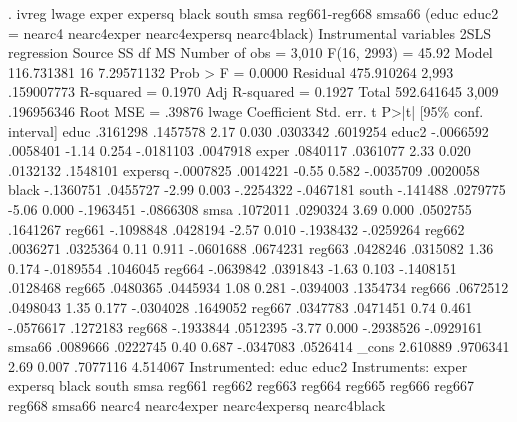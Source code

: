 . ivreg lwage exper expersq black south smsa reg661-reg668 smsa66 (educ educ2 = nearc4 nearc4exper nearc4expersq nearc4black)
{\smallskip}
Instrumental variables 2SLS regression
{\smallskip}
      Source {\VBAR}       SS           df       MS      Number of obs   =     3,010
   F(16, 2993)     =     45.92
       Model {\VBAR}  116.731381        16  7.29571132   Prob > F        =    0.0000
    Residual {\VBAR}  475.910264     2,993  .159007773   R-squared       =    0.1970
   Adj R-squared   =    0.1927
       Total {\VBAR}  592.641645     3,009  .196956346   Root MSE        =    .39876
{\smallskip}
       lwage {\VBAR} Coefficient  Std. err.      t    P>|t|     [95\% conf. interval]
        educ {\VBAR}   .3161298   .1457578     2.17   0.030     .0303342    .6019254
       educ2 {\VBAR}  -.0066592   .0058401    -1.14   0.254    -.0181103    .0047918
       exper {\VBAR}   .0840117   .0361077     2.33   0.020     .0132132    .1548101
     expersq {\VBAR}  -.0007825   .0014221    -0.55   0.582    -.0035709    .0020058
       black {\VBAR}  -.1360751   .0455727    -2.99   0.003    -.2254322   -.0467181
       south {\VBAR}   -.141488   .0279775    -5.06   0.000    -.1963451   -.0866308
        smsa {\VBAR}   .1072011   .0290324     3.69   0.000     .0502755    .1641267
      reg661 {\VBAR}  -.1098848   .0428194    -2.57   0.010    -.1938432   -.0259264
      reg662 {\VBAR}   .0036271   .0325364     0.11   0.911    -.0601688    .0674231
      reg663 {\VBAR}   .0428246   .0315082     1.36   0.174    -.0189554    .1046045
      reg664 {\VBAR}  -.0639842   .0391843    -1.63   0.103    -.1408151    .0128468
      reg665 {\VBAR}   .0480365   .0445934     1.08   0.281    -.0394003    .1354734
      reg666 {\VBAR}   .0672512   .0498043     1.35   0.177    -.0304028    .1649052
      reg667 {\VBAR}   .0347783   .0471451     0.74   0.461    -.0576617    .1272183
      reg668 {\VBAR}  -.1933844   .0512395    -3.77   0.000    -.2938526   -.0929161
      smsa66 {\VBAR}   .0089666   .0222745     0.40   0.687    -.0347083    .0526414
       _cons {\VBAR}   2.610889   .9706341     2.69   0.007     .7077116    4.514067
Instrumented: educ educ2
 Instruments: exper expersq black south smsa reg661 reg662 reg663 reg664
              reg665 reg666 reg667 reg668 smsa66 nearc4 nearc4exper
              nearc4expersq nearc4black
{\smallskip}

